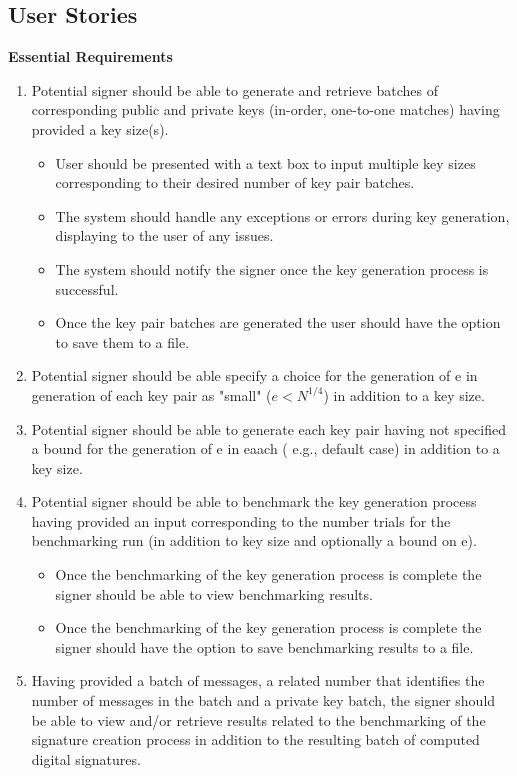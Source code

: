 \documentclass[]{final_report}
\theoremstyle{definition}
\begin{document}
\subsection{User Stories}
\textbf{Essential Requirements}
\begin{enumerate}
\item Potential signer should be able to generate and retrieve batches of corresponding public and private keys (in-order, one-to-one matches) having provided a key size(s).
\begin{itemize}
\item User should be presented with a text box to input multiple key sizes corresponding to their desired number of key pair batches.
\item The system should handle any exceptions or errors during key generation, displaying to the user of any issues.
\item The system should notify the signer once the key generation process is successful.
\item Once the key pair batches are generated the user should have the option to save them to a file.
\end{itemize}
\item Potential signer should be able specify a choice for the generation of e in generation of each key pair as "small" (\( e < N^{1/4} \)) in addition to a key size.
\item Potential signer should be able to generate each key pair having not specified a bound for the generation of e in eaach ( e.g., default case) in addition to a key size.
\item Potential signer should be able to benchmark the key generation process having provided an input corresponding to the number trials for the benchmarking run (in addition to key size and optionally a bound on e).
\begin{itemize}
\item Once the benchmarking of the key generation process is complete the signer should be able to view benchmarking results.
\item Once the benchmarking of the key generation process is complete the signer should have the option to save benchmarking results to a file.
\end{itemize}
\item Having provided a batch of messages, a related number that identifies the number of messages in the batch and a private key batch, the signer should be able to view and/or retrieve results related to the benchmarking of the signature creation process in addition to the resulting batch of computed digital signatures.

\end{enumerate}
\end{document}

